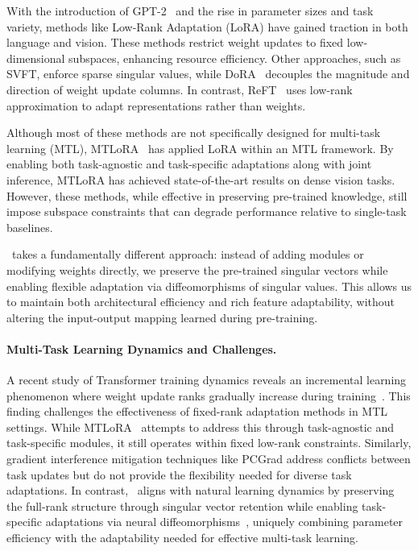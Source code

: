 With the introduction of GPT-2~\citep{radford2019language} and the rise in parameter sizes and task variety, methods like Low-Rank Adaptation (LoRA)\citep{hu2022lora} have gained traction in both language and vision. These methods restrict weight updates to fixed low-dimensional subspaces, enhancing resource efficiency. Other approaches, such as SVFT\citep{lingam2024svft}, enforce sparse singular values, while DoRA~\citep{liu2024dora} decouples the magnitude and direction of weight update columns. In contrast, ReFT~\citep{wuandarora2024reft} uses low-rank approximation to adapt representations rather than weights.

Although most of these methods are not specifically designed for multi-task learning (MTL), MTLoRA~\citep{agiza2024mtlora} has applied LoRA within an MTL framework. By enabling both task-agnostic and task-specific adaptations along with joint inference, MTLoRA has achieved state-of-the-art results on dense vision tasks. However, these methods, while effective in preserving pre-trained knowledge, still impose subspace constraints that can degrade performance relative to single-task baselines. 

\ourmethod\ takes a fundamentally different approach: instead of adding modules or modifying weights directly, we preserve the pre-trained singular vectors while enabling flexible adaptation via diffeomorphisms of singular values. This allows us to maintain both architectural efficiency and rich feature adaptability, without altering the input-output mapping learned during pre-training.
\vspace{-2pt}
\paragraph{Multi-Task Learning Dynamics and Challenges.} 
A recent study of Transformer training dynamics reveals an incremental learning phenomenon where weight update ranks gradually increase during training~\cite {NEURIPS2023_4d69c1c0}. This finding challenges the effectiveness of fixed-rank adaptation methods in MTL settings. While MTLoRA~\citep{agiza2024mtlora} attempts to address this through task-agnostic and task-specific modules, it still operates within fixed low-rank constraints. Similarly, gradient interference mitigation techniques like PCGrad address conflicts between task updates but do not provide the flexibility needed for diverse task adaptations. In contrast, \ourmethod\ aligns with natural learning dynamics by preserving the full-rank structure through singular vector retention while enabling task-specific adaptations via neural diffeomorphisms~\citep{freifeld2015highly, freifeld2017transformations}, uniquely combining parameter efficiency with the adaptability needed for effective multi-task learning.

